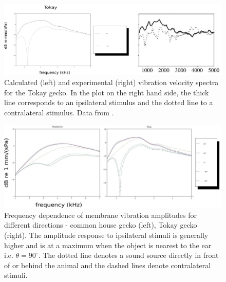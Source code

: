 \begin{figure}[ht!]
 \centering
 \includegraphics[width=1.0\linewidth]{Diagrams/Plots/tokayipsivscontrafull.png}
 \caption[Frequency dependence of ipsi- and contralateral membrane vibration amplitudes - Tokay gecko]{Calculated (left) and experimental (right) vibration velocity spectra for the Tokay gecko. In
 the plot on the right hand side, the thick line corresponds to an ipsilateral stimulus and the dotted line to a contralateral stimulus.  Data from \cite{dalsgaardmanley1}.}
  \label{tokayipsivscontrafull}
\end{figure}
\begin{figure}[ht!]
\centering
  \includegraphics[width=1.0\linewidth]{Diagrams/Plots/freqdepboth.png}
  \caption[Frequency dependence of membrane vibration amplitudes for different directions.]{Frequency dependence of membrane vibration amplitudes for different directions - common house gecko (left), Tokay gecko (right). 
  The amplitude response to ipsilateral stimuli is generally higher and is at a maximum when the object is nearest to the ear i.e. $\theta=90^\circ$. The dotted line denotes a sound source directly in front of or behind the animal and the dashed lines denote contralateral stimuli.}
  \label{freqdepboth}
\end{figure}

